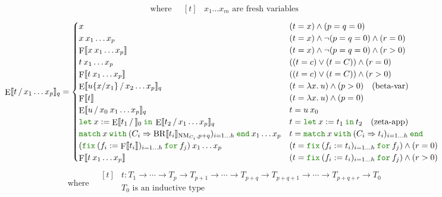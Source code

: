 \documentclass[a4paper,fleqn]{article}
\newcommand{\kwlet}{\mbox{\color{mygreen}\ttfamily let}}
\newcommand{\kwin}{\mbox{\color{mygreen}\ttfamily in}}
\newcommand{\kwmatch}{\mbox{\color{mygreen}\ttfamily match}}
\newcommand{\kwwith}{\mbox{\color{mygreen}\ttfamily with}}
\newcommand{\kwend}{\mbox{\color{mygreen}\ttfamily end}}
\newcommand{\kwfix}{\mbox{\color{mygreen}\ttfamily fix}}
\newcommand{\kwfor}{\mbox{\color{mygreen}\ttfamily for}}
\newcommand{\lam}[2]{\lambda #1.\:#2}
\newcommand{\letin}[3]{\kwlet\:#1:=#2\:\kwin\:#3}
\newcommand{\match}[4]{\kwmatch\:#1\:\kwwith\:(#2 \Rightarrow #3)_{#4}\:\kwend}
\newcommand{\fix}[4]{\kwfix\:(#1 := #2)_{#3}\:\kwfor\:#4}
\DeclareMathOperator{\NM}{NM} %
\newcommand{\BRA}[1]{\llbracket #1 \rrbracket}
\DeclareMathOperator{\Fop}{F}
\newcommand{\F}[1]{\Fop\BRA{#1}}
\DeclareMathOperator{\BRop}{BR}
\newcommand{\BR}[3]{\BRop\BRA{#1}_{#2,#3}}
\DeclareMathOperator{\Eop}{E}
\newcommand{\E}[3]{\Eop\BRA{#1\,/\,#2}_{#3}}
\newcommand{\subst}[3]{#1\{#2/#3\}}
\begin{document}
\[ \quad\text{where} \quad
  \begin{aligned}[t]
    & \text{$x_1\ldots x_m$ are fresh variables}
  \end{aligned}
\]
\[
  \E{t}{x_1\ldots x_p}{q} =
  \begin{cases}
    x                                                                                                 & (t = x) \wedge (p = q = 0) \\
    x\:x_1\ldots x_p                                                                                    & (t = x) \wedge \neg (p = q = 0) \wedge (r = 0) \\
    \F{x\:x_1\ldots x_p}                                                                                 & (t = x) \wedge \neg (p = q = 0) \wedge (r > 0) \\
    t\:x_1\ldots x_p                                                                                    & ((t = c) \vee (t = C)) \wedge (r = 0) \\
    \F{t\:x_1\ldots x_p}                                                                                 & ((t = c) \vee (t = C)) \wedge (r > 0) \\
    \E{\subst{u}{x}{x_1}}{x_2\ldots x_p}{q}                                                             & (t = \lam{x}{u}) \wedge (p > 0) \quad \text{(beta-var)} \\
    \F{t}                                                                                              & (t = \lam{x}{u}) \wedge (p = 0) \\
    \E{u}{x_0\:x_1\ldots x_p}{q}                                                                & t = u\:x_0 \\
    \letin{x}{\E{t_1}{}{0}}{\E{t_2}{x_1\ldots x_p}{q}}                                                            & t = \letin{x}{t_1}{t_2} \quad \text{(zeta-app)} \\
    \match{x}{C_i}{\BR{t_i}{\NM_{C_i}}{p+q}}{i=1\ldots h}\:x_1\ldots x_p                                   & t = \match{x}{C_i}{t_i}{i=1\ldots h} \\
    (\fix{f_i}{\F{t_i}}{i=1\ldots h}{f_j})\:x_1\ldots x_p                                             & (t = \fix{f_i}{t_i}{i=1\ldots h}{f_j}) \wedge (r = 0) \\
    \F{t\:x_1\ldots x_p}                                             & (t = \fix{f_i}{t_i}{i=1\ldots h}{f_j}) \wedge (r > 0)
  \end{cases}
\]
\[ \quad\text{where} \quad
  \begin{aligned}[t]
    & t : T_1 \rightarrow \dotsb \rightarrow T_p \rightarrow
          T_{p+1} \rightarrow \dotsb \rightarrow T_{p+q} \rightarrow
          T_{p+q+1} \rightarrow \dotsb \rightarrow T_{p+q+r} \rightarrow T_0 \\
    & \text{$T_0$ is an inductive type} \\
  \end{aligned}
\]
\end{document}
